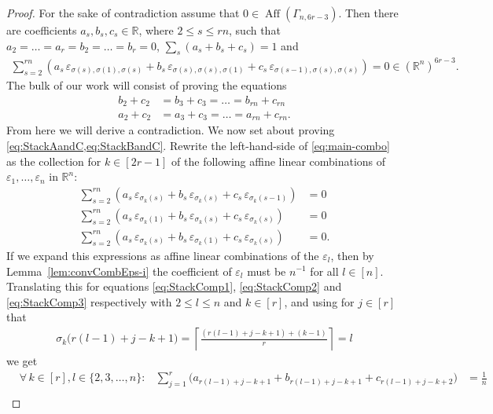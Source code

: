 \documentclass[10pt,a4paper]{article}
\numberwithin{equation}{section}
\DeclareMathOperator{\aff}{Aff}
\newcommand{\RR}{\mathbb R}
\newcommand{\eps}{\varepsilon}
\begin{document}
\begin{proof}
For the sake of contradiction assume that $0 \in \aff(\Gamma_{n, 6 r - 3})$. Then there are coefficients $a_s, b_s, c_s \in \RR$, where $2 \leq s \leq r n$, such that $a_2 = \ldots = a_r = b_2 = \ldots = b_r = 0$, $\sum_s (a_s + b_s + c_s) = 1$ and
	\begin{align}
	\sum_{s= 2}^{r n} \left( a_s \, \eps_{\sigma(s),\sigma(1),\sigma(s)}
	+ b_s \, \eps_{\sigma(s),\sigma(s),\sigma(1)} + c_s \, \eps_{\sigma(s-1),\sigma(s),\sigma(s)}  \right) = 0 \in (\RR^n)^{6 r - 3}.\label{eq:main-combo}
	\end{align}
	The bulk of our work will consist of proving the equations
	\begin{align}\label{eq:StackBandC}
	b_2 + c_2 &= b_3 + c_3 = \ldots = b_{r n} + c_{r n}\\
	\label{eq:StackAandC} a_2 + c_2 &= a_3 + c_3 = \ldots = a_{r n} + c_{r n}.
	\end{align}
	From here we will derive a contradiction. We now set about proving \cref{eq:StackAandC,eq:StackBandC}. Rewrite the left-hand-side of \cref{eq:main-combo} as the collection for $k \in [2 r - 1]$ of the following affine linear combinations of $\eps_1,\ldots,\eps_n$ in $\RR^n$:
	\begin{align}
	\sum_{s= 2}^{r n} \left( a_s \, \eps_{\sigma_k(s)} 
	+ b_s \, \eps_{\sigma_k(s)} + c_s \, \eps_{\sigma_k(s-1)}  \right) &= 0 \label{eq:StackComp1}\\
	\sum_{s= 2}^{r n} \left( a_s \, \eps_{\sigma_k(1)}
	+ b_s \, \eps_{\sigma_k(s)} + c_s \, \eps_{\sigma_k(s)}  \right) &= 0 \label{eq:StackComp2} \\
	\sum_{s= 2}^{r n} \left( a_s \, \eps_{\sigma_k(s)}
	+ b_s \, \eps_{\sigma_k(1)} + c_s \, \eps_{\sigma_k(s)}  \right) &= 0. \label{eq:StackComp3}
	\end{align}
If we expand this expressions as affine linear combinations of the $\eps_l$, then by Lemma~\ref{lem:convCombEps-i} the coefficient of $\eps_l$ must be $n^{-1}$ for all $l \in [n]$. Translating this for equations \eqref{eq:StackComp1}, \eqref{eq:StackComp2} and \eqref{eq:StackComp3} respectively with $2 \leq l \leq n$ and $k \in [r]$, and using for $j \in [r]$ that
	\begin{align}
	\sigma_{k} \big(r(l-1)+j - k + 1 \big) = \left\lceil \frac{(r(l-1)+j - k + 1) + (k-1)}{r} \right\rceil = l \label{eq:sigma-inverse}
	\end{align}
we get
	\begin{align}
	&\forall \, k \in [r], l \in \{2,3,\ldots,n\} \colon  &\sum_{j=1}^r \big( a_{r(l-1)+j - k + 1} + b_{r(l-1)+j - k + 1} + c_{r(l-1)+j- k + 2} \big) &= \frac{1}{n} \label{eq:Coeff1} \\

\end{align}
\end{proof}
\end{document}
